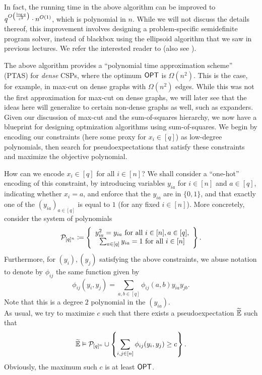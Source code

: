 \documentclass{article}
\begin{document}
In fact, the running time in the above algorithm can be improved to $q^{O\left( \frac{\log q}{\varepsilon^2} \right)} \cdot n^{O(1)}$, which is polynomial in $n$.
While we will not discuss the details thereof, this improvement involves designing a problem-specific semidefinite program solver, instead of blackbox using the ellipsoid algorithm that we saw in previous lectures. We refer the interested reader to \cite{GS12} (also see \cite{OGT13}).

The above algorithm provides a ``polynomial time approximation scheme'' (PTAS) for \emph{dense} CSPs, where the optimum $\mathsf{OPT}$ is $\Omega(n^2)$. This is the case, for example, in max-cut on dense graphs with $\Omega(n^2)$ edges. While this was not the first approximation for max-cut on dense graphs, we will later see that the ideas here will generalize to certain non-dense graphs as well, such as expanders. \\

Given our discussion of max-cut and the sum-of-squares hierarchy, we now have a blueprint for designing optmization algorithms using sum-of-squares. We begin by encoding our constraints (here some proxy for $x_i \in [q]$) as low-degree polynomials, then search for pseudoexpectations that satisfy these constraints and maximize the objective polynomial.

How can we encode $x_i \in [q]$ for all $i \in [n]$? We shall consider a ``one-hot'' encoding of this constraint, by introducing variables $y_{ia}$ for $i \in [n]$ and $a \in [q]$, indicating whether $x_i = a$, and enforce that the $y_{ia}$ are in $\{0,1\}$, and that exactly one of the $(y_{ia})_{a \in [q]}$ is equal to $1$ (for any fixed $i \in [n]$). More concretely, consider the system of polynomials
\[ \mathcal{P}_{[q]^n} \coloneqq
\left\{
\begin{array}{c}
	y_{ia}^2 = y_{ia} \text{ for all } i \in [n], a \in [q], \\
	\sum_{a \in [q]} y_{ia} = 1 \text{ for all } i \in [n]
\end{array}
\right\}. \]
Furthermore, for $(y_i),(y_j)$ satisfying the above constraints, we abuse notation to denote by $\phi_{ij}$ the same function given by
\[ \phi_{ij}(y_i,y_j) = \sum_{a,b \in [q]} \phi_{ij}(a,b) y_{ia} y_{jb}. \]
Note that this is a degree $2$ polynomial in the $(y_{ia})$.\\

As usual, we try to maximize $c$ such that there exists a pseudoexpectation $\widetilde{\mathbb{E}}$ such that
\[ \widetilde{\mathbb{E}} \vDash \mathcal{P}_{[q]^n} \cup \left\{ \sum_{i,j \in [n]} \phi_{ij}(y_i,y_j) \ge c \right\}. \]
Obviously, the maximum such $c$ is at least $\mathsf{OPT}$.
\end{document}
